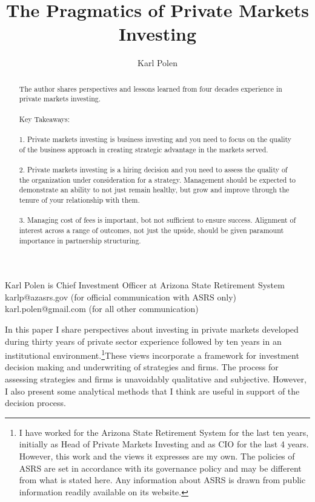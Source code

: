 \documentclass[12pt,english]{article}\usepackage[]{graphicx}\usepackage[]{color}
\newcommand{\lyxaddress}[1]{
	\par {\raggedright #1
	\vspace{1.4em}
	\noindent\par}
}
\begin{document}
\title{The Pragmatics of Private Markets Investing}
\author{Karl Polen}
\maketitle

\lyxaddress{Karl Polen is Chief Investment Officer at Arizona State Retirement
System\\karlp@azasrs.gov (for official communication with ASRS only)
\\karl.polen@gmail.com (for all other communication)}

\begin{abstract}
The author shares perspectives and lessons learned from four decades
experience in private markets investing.\\\\Key Takeaways:\\\\1.
Private markets investing is business investing and you need to focus
on the quality of the business approach in creating strategic advantage
in the markets served.\\\\2. Private markets investing is a hiring
decision and you need to assess the quality of the organization under
consideration for a strategy. Management should be expected to demonstrate
an ability to not just remain healthy, but grow and improve through
the tenure of your relationship with them.\\\\3. Managing cost of
fees is important, bot not sufficient to ensure success. Alignment
of interest across a range of outcomes, not just the upside, should
be given paramount importance in partnership structuring.
\end{abstract}
\pagebreak

In this paper I share perspectives about investing in private markets
developed during thirty years of private sector experience followed
by ten years in an institutional environment.\footnote{I have worked for the Arizona State Retirement System for the last
ten years, initially as Head of Private Markets Investing and as CIO
for the last 4 years. However, this work and the views it expresses
are my own. The policies of ASRS are set in accordance with its governance
policy and may be different from what is stated here. Any information
about ASRS is drawn from public information readily available on its
website. }These views incorporate a framework for investment decision making
and underwriting of strategies and firms. The process for assessing
strategies and firms is unavoidably qualitative and subjective. However,
I also present some analytical methods that I think are useful in
support of the decision process. 
\end{document}
